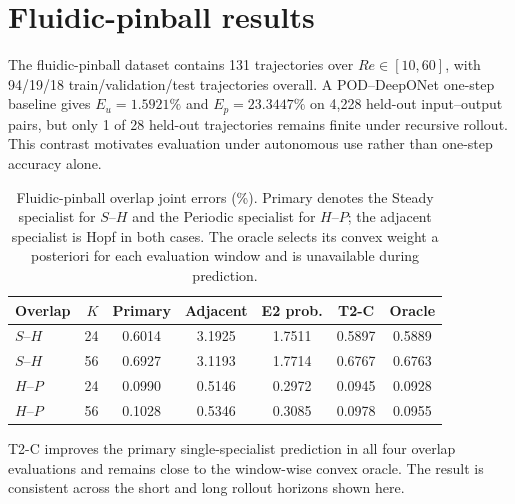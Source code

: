 \section{Fluidic-pinball results}
\label{app:pinball}

The fluidic-pinball dataset contains 131 trajectories over $Re\in[10,60]$, with 94/19/18 train/validation/test trajectories overall. A POD--DeepONet one-step baseline gives $E_u=1.5921\%$ and $E_p=23.3447\%$ on 4,228 held-out input--output pairs, but only 1 of 28 held-out trajectories remains finite under recursive rollout. This contrast motivates evaluation under autonomous use rather than one-step accuracy alone.

\begin{table}[h]
\centering
\caption{Fluidic-pinball overlap joint errors (\%). Primary denotes the Steady
specialist for $S$--$H$ and the Periodic specialist for $H$--$P$; the adjacent
specialist is Hopf in both cases. The oracle selects its convex weight a
posteriori for each evaluation window and is unavailable during prediction.}
\label{tab:pinball_overlap}
\small
\setlength{\tabcolsep}{3.5pt}
\begin{tabular}{lrccccc}
\toprule
Overlap & $K$ & Primary & Adjacent & E2 prob. & T2-C & Oracle \\
\midrule
$S$--$H$ & 24 & 0.6014 & 3.1925 & 1.7511 & 0.5897 & 0.5889 \\
$S$--$H$ & 56 & 0.6927 & 3.1193 & 1.7714 & 0.6767 & 0.6763 \\
$H$--$P$ & 24 & 0.0990 & 0.5146 & 0.2972 & 0.0945 & 0.0928 \\
$H$--$P$ & 56 & 0.1028 & 0.5346 & 0.3085 & 0.0978 & 0.0955 \\
\bottomrule
\end{tabular}
\end{table}

T2-C improves the primary single-specialist prediction in all four overlap evaluations and remains close to the window-wise convex oracle. The result is consistent across the short and long rollout horizons shown here.
